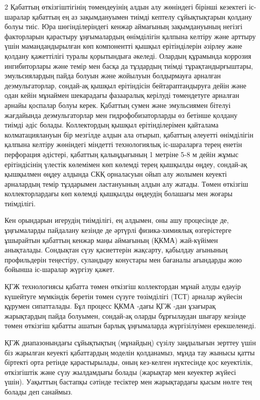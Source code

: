 \begin{multicols}{2}
Қабаттың өткізгіштігінің төмендеуінің алдын алу жөніндегі бірінші
кезектегі іс-шаралар қабаттың ең аз зақымдануымен тиімді кептелу
сұйықтықтарын қолдану болуы тиіс. Юра шөгінділеріндегі кенжар аймағының
зақымдануының негізгі факторларын қарастыру ұңғымалардың өнімділігін
қалпына келтіру және арттыру үшін мамандандырылған көп компонентті
қышқыл ерітінділерін әзірлеу және қолдану қажеттілігі туралы қорытындыға
әкеледі. Олардың құрамында коррозия ингибиторлары және темір мен басқа
да тұздардың тиімді тұрақтандырғыштары, эмульсиялардың пайда болуын және
жойылуын болдырмауға арналған деэмульгаторлар, сондай-ақ қышқыл
ерітіндісін бейтараптандыруға дейін және одан кейін мұнаймен шекарадағы
фазааралық керілуді төмендетуге арналған арнайы қоспалар болуы керек.
Қабаттың сумен және эмульсиямен бітелуі жағдайында деэмульгаторлар мен
гидрофобизаторларды өз бетінше қолдану тиімді әдіс болады. Коллектордың
қышқыл ерітінділерімен қайталама колматациялануын бір мезгілде алдын ала
отырып, қабаттың әлеуетті өнімділігін қалпына келтіру жөніндегі міндетті
технологиялық іс-шараларға терең енетін перфорация әдістері, қабаттың
қалыңдығының 1 метріне 5-8 м дейін жұмыс
ерітіндісінің үлестік көлемімен көп көлемді терең қышқылды өңдеу,
сондай-ақ қышқылмен өңдеу алдында СКҚ орналасуын ойып алу жолымен
кеуекті арналардың темір тұздарымен ластануының алдын алу жатады. Төмен
өткізгіш коллекторлардағы көп көлемді қышқылды өңдеудің болашағы мен
жоғары тиімділігі.

Кен орындарын игерудің тиімділігі, ең алдымен, оны ашу процесінде де,
ұңғымаларды пайдалану кезінде де әртүрлі физика-химиялық өзгерістерге
ұшырайтын қабаттың кенжар маңы аймағының (ҚКМА) жай-күйімен анықталады.
Сондықтан сүзу қасиеттерін жақсарту, қабылдау ағынының профильдерін
теңестіру, суландыру конустары мен бағаналы ағындарды жою бойынша
іс-шаралар жүргізу қажет.

ҚГЖ технологиясы қабатта төмен өткізгіш коллектордан мұнай алуды едәуір
күшейтуге мүмкіндік беретін төмен сүзуге төзімділігі (ТСТ) арналар
жүйесін құрумен сипатталады. Бұл процесс ҚКМА -дағы ҚГЖ -дан ұзағырақ
жарықтардың пайда болуымен, сондай-ақ оларды бұрғылаудан шығару кезінде
төмен өткізгіш қабатты ашатын барлық ұңғымаларда жүргізілуімен
ерекшеленеді.

ҚГЖ диапазонындағы сұйықтықтың (мұнайдың) сүзілу заңдылығын зерттеу үшін
біз жарылған кеуекті қабаттардың моделін қолданамыз, мұнда тау жынысы
қатты біртекті орта ретінде қарастырылады, оның кез-келген нүктесінде
қос кеуектілік, өткізгіштік және сүзу жылдамдығы болады (жарықтар мен
кеуектер жүйесі үшін). Уақыттың бастапқы сәтінде тесіктер мен
жарықтардағы қысым нөлге тең болады деп санаймыз.


\end{multicols}
